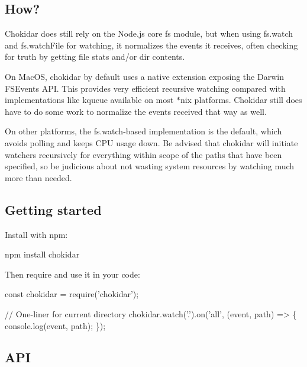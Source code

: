 \subsection*{How?}

Chokidar does still rely on the Node.\+js core {\ttfamily fs} module, but when using {\ttfamily fs.\+watch} and {\ttfamily fs.\+watch\+File} for watching, it normalizes the events it receives, often checking for truth by getting file stats and/or dir contents.

On Mac\+OS, chokidar by default uses a native extension exposing the Darwin {\ttfamily F\+S\+Events} A\+PI. This provides very efficient recursive watching compared with implementations like {\ttfamily kqueue} available on most $\ast$nix platforms. Chokidar still does have to do some work to normalize the events received that way as well.

On other platforms, the {\ttfamily fs.\+watch}-\/based implementation is the default, which avoids polling and keeps C\+PU usage down. Be advised that chokidar will initiate watchers recursively for everything within scope of the paths that have been specified, so be judicious about not wasting system resources by watching much more than needed.

\subsection*{Getting started}

Install with npm\+:


\begin{DoxyCode}
npm install chokidar
\end{DoxyCode}


Then {\ttfamily require} and use it in your code\+:


\begin{DoxyCode}
const chokidar = require('chokidar');

// One-liner for current directory
chokidar.watch('.').on('all', (event, path) => \{
  console.log(event, path);
\});
\end{DoxyCode}


\subsection*{A\+PI}



